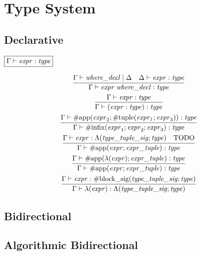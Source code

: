 \section{Type System}

\subsection{Declarative}

$\fbox{$\Gamma \vdash \mathit{expr}: \mathit{type}$}$

\begin{gather*}
    \infer{\Gamma \vdash \mathit{expr}\; \mathit{where\_decl}: \mathit{type}}{
        \Gamma \vdash \mathit{where\_decl} \mid \Delta
        &
        \Delta \vdash \mathit{expr}: \mathit{type}
    }
    \\
    \infer{\Gamma \vdash (\mathit{expr}: \mathit{type}): \mathit{type}}{
        \Gamma \vdash \mathit{expr}: \mathit{type}
    }
    \\
    \infer{\Gamma \vdash \mathrm{\#infix}(\mathit{expr}_1; \mathit{expr}_2; \mathit{expr}_3): \mathit{type}}{
        \Gamma \vdash \mathrm{\#app}(\mathit{expr}_2; \mathrm{\#tuple}(\mathit{expr_1}; \mathit{expr}_3)): \mathit{type}
    }
    \\
    \infer{\Gamma \vdash \mathrm{\#app}(\mathit{expr}; \mathit{expr\_tuple}): \mathit{type}}{
        \Gamma \vdash \mathit{expr}: \Lambda(\mathit{type\_tuple\_sig}; \mathit{type})
        &
        \text{TODO}
    }
    \\
    \infer{\Gamma \vdash \mathrm{\#app}(\mathit{expr}; \mathit{expr\_tuple}): \mathit{type}}{
        \Gamma \vdash \mathrm{\#app}(\lambda(\mathit{expr}); \mathit{expr\_tuple}): \mathit{type}
    }
    \\
    \infer{\Gamma \vdash \lambda(\mathit{expr}): \Lambda(\mathit{type\_tuple\_sig}; \mathit{type})}{
        \Gamma \vdash \mathit{expr}: \mathrm{\#block\_sig}(\mathit{type\_tuple\_sig}; \mathit{type})
    }
\end{gather*}

\subsection{Bidirectional}

\subsection{Algorithmic Bidirectional}
